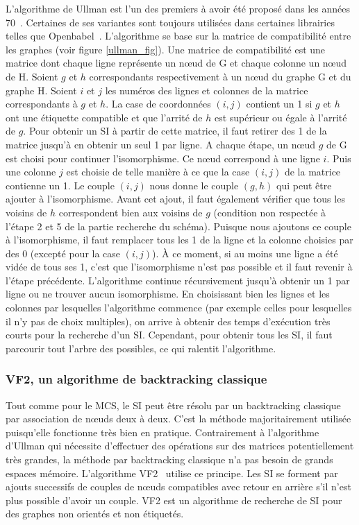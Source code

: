 L'algorithme de Ullman est l'un des premiers à avoir été proposé dans les années 70~\cite{ullmann_algorithm_1976}.
Certaines de ses variantes sont toujours utilisées dans certaines librairies telles que Openbabel~\cite{oboyle_open_2011}.
L'algorithme se base sur la matrice de compatibilité entre les graphes (voir figure \ref{ullman_fig}).
Une matrice de compatibilité est une matrice dont chaque ligne représente un n\oe{}ud de G et chaque colonne un n\oe{}ud de H.
Soient $g$ et $h$ correspondants respectivement à un n\oe{}ud du graphe G et du graphe H.
Soient $i$ et $j$ les numéros des lignes et colonnes de la matrice correspondants à $g$ et $h$.
La case de coordonnées $(i,j)$ contient un 1 si $g$ et $h$ ont une étiquette compatible et que l'arrité de $h$ est supérieur ou égale à l'arrité de $g$.
Pour obtenir un SI à partir de cette matrice, il faut retirer des 1 de la matrice jusqu'à en obtenir un seul 1 par ligne.
A chaque étape, un n\oe{}ud $g$ de G est choisi pour continuer l'isomorphisme.
Ce n\oe{}ud correspond à une ligne $i$.
Puis une colonne $j$ est choisie de telle manière à ce que la case $(i,j)$ de la matrice contienne un 1.
Le couple $(i,j)$ nous donne le couple $(g,h)$ qui peut être ajouter à l'isomorphisme.
Avant cet ajout, il faut également vérifier que tous les voisins de $h$ correspondent bien aux voisins de $g$ (condition non respectée à l'étape 2 et 5 de la partie recherche du schéma).
Puisque nous ajoutons ce couple à l'isomorphisme, il faut remplacer tous les 1 de la ligne et la colonne choisies par des 0 (excepté pour la case $(i,j)$).
À ce moment, si au moins une ligne a été vidée de tous ses 1, c'est que l'isomorphisme n'est pas possible et il faut revenir à l'étape précédente.
L'algorithme continue récursivement jusqu'à obtenir un 1 par ligne ou ne trouver aucun isomorphisme.
En choisissant bien les lignes et les colonnes par lesquelles l'algorithme commence (par exemple celles pour lesquelles il n'y pas de choix multiples), on arrive à obtenir des temps d'exécution très courts pour la recherche d'un SI.
Cependant, pour obtenir tous les SI, il faut parcourir tout l'arbre des possibles, ce qui ralentit l'algorithme.


\subsubsection{VF2, un algorithme de backtracking classique}

Tout comme pour le MCS, le SI peut être résolu par un backtracking classique par association de n\oe{}uds deux à deux.
C'est la méthode majoritairement utilisée puisqu'elle fonctionne très bien en pratique.
Contrairement à l'algorithme d'Ullman qui nécessite d'effectuer des opérations sur des matrices potentiellement très grandes, la méthode par backtracking classique n'a pas besoin de grands espaces mémoire.
L'algorithme VF2~\cite{cordella_subgraph_2004} utilise ce principe.
Les SI se forment par ajouts successifs de couples de n\oe{}uds compatibles avec retour en arrière s'il n'est plus possible d'avoir un couple.
VF2 est un algorithme de recherche de SI pour des graphes non orientés et non étiquetés.

